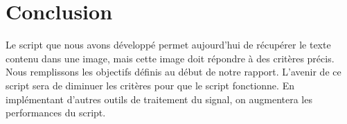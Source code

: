 \documentclass[a4paper,12pt,titlepage]{report}
\begin{document}
	\section{Conclusion}
	Le script que nous avons développé permet aujourd'hui de récupérer le texte contenu dans une image, mais cette image doit répondre à des critères précis. Nous remplissons les objectifs définis au début de notre rapport. L'avenir de ce script sera de diminuer les critères pour que le script fonctionne. En implémentant d'autres outils de traitement du signal, on augmentera les performances du script.
	
\end{document}

